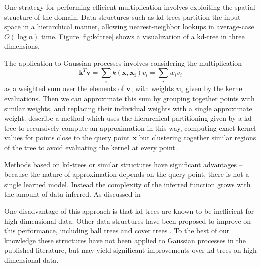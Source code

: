 \documentclass{article}
\begin{document}
One strategy for performing efficient multiplication involves exploiting the spatial structure of the domain. Data structures such as kd-trees partition the input space in a hierarchical manner, allowing nearest-neighbor lookups in average-case $O(\log n)$ time. Figure \ref{fig:kdtree} shows a visualization of a kd-tree in three dimensions.  

The application to Gaussian processes involves considering the multiplication 
\[\mathbf{k}^T \mathbf{v} = \sum_{i} k(\mathbf{x}, \mathbf{x_i})v_i = \sum_{i} w_iv_i\]
as a weighted sum over the elements of $\mathbf{v}$, with weights $w_i$ given by the kernel evaluations. Then we can approximate this sum by grouping together points with similar weights, and replacing their individual weights with a single approximate weight. \cite{shen2006fast} describe a method which uses the hierarchical partitioning given by a kd-tree to recursively compute an approximation in this way, computing exact kernel values for points close to the query point $\mathbf{x}$ but clustering together similar regions of the tree to avoid evaluating the kernel at every point. 

Methods based on kd-trees or similar structures have significant advantages -- because the nature of approximation depends on the query point, there is not a single learned model. Instead the complexity of the inferred function grows with the amount of data inferred. As discussed in \cite{murray2009gaussian}

One disadvantage of this approach is that kd-trees are known to be inefficient for high-dimensional data. Other data structures have been proposed to improve on this performance, including ball trees \cite{omohundro1989five} and cover trees \cite{beygelzimer2006cover}. To the best of our knowledge these structures have not been applied to Gaussian processes in the published literature, but may yield significant improvements over kd-trees on high dimensional data. 
\end{document}
